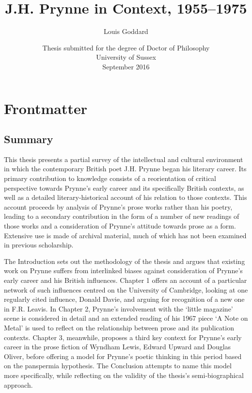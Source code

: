\documentclass[]{article}
\date{}
\begin{document}
\newpage


\begin{titlepage}
\title{J.H. Prynne in Context, 1955--1975}
\author{Louis Goddard}
\date{\vfill Thesis submitted for the degree of Doctor of Philosophy\\
    University of Sussex\\
    September 2016}
\maketitle
\end{titlepage}

\newpage

 \tableofcontents
\newpage

\section{Frontmatter}\label{frontmatter}

\subsection{Summary}\label{summary}

\noindent This thesis presents a partial survey of the intellectual and
cultural environment in which the contemporary British poet J.H. Prynne
began his literary career. Its primary contribution to knowledge
consists of a reorientation of critical perspective towards Prynne's
early career and its specifically British contexts, as well as a
detailed literary-historical account of his relation to those contexts.
This account proceeds by analysis of Prynne's prose works rather than
his poetry, leading to a secondary contribution in the form of a number
of new readings of those works and a consideration of Prynne's attitude
towards prose as a form. Extensive use is made of archival material,
much of which has not been examined in previous scholarship.

The Introduction sets out the methodology of the thesis and argues that
existing work on Prynne suffers from interlinked biases against
consideration of Prynne's early career and his British influences.
Chapter 1 offers an account of a particular network of such influences
centred on the University of Cambridge, looking at one regularly cited
influence, Donald Davie, and arguing for recognition of a new one in
F.R. Leavis. In Chapter 2, Prynne's involvement with the `little
magazine' scene is considered in detail and an extended reading of his
1967 piece `A Note on Metal' is used to reflect on the relationship
between prose and its publication contexts. Chapter 3, meanwhile,
proposes a third key context for Prynne's early career in the prose
fiction of Wyndham Lewis, Edward Upward and Douglas Oliver, before
offering a model for Prynne's poetic thinking in this period based on
the panspermia hypothesis. The Conclusion attempts to name this model
more specifically, while reflecting on the validity of the thesis's
semi-biographical approach.
\end{document}
